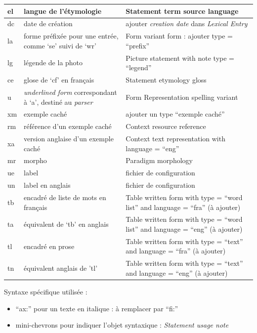 \documentclass[a4paper,12pt]{article}
\begin{document}
\begin{center}
\begin{longtable}{|p{4cm}|p{5cm}|p{6cm}|}
el & langue de l’étymologie & Statement term source language \\ \hline
dc & date de création & ajouter \textit{creation date} dans \textit{Lexical Entry} \\ \hline
la & forme préfixée pour une entrée, comme ‘se’ suivi de `wr' & Form variant form : ajouter type = “prefix” \\ \hline
lg & légende de la photo & Picture statement with note type = ``legend'' \\ \hline
ce & glose de `cf' en français & Statement etymology gloss \\ \hline
u & \textit{underlined form} correspondant à ‘a’, destiné au \textit{parser} & Form Representation spelling variant \\ \hline
xm & exemple caché & ajouter un type ``exemple caché'' \\ \hline
rm & référence d’un exemple caché & Context resource reference \\ \hline
xa & version anglaise d’un exemple caché & Context text representation with language = “eng” \\ \hline
mr & morpho & Paradigm morphology \\ \hline
ue & label & fichier de configuration \\ \hline
un & label en anglais & fichier de configuration \\ \hline
tb & encadré de liste de mots en français & Table written form with type = ``word list'' and language = ``fra'' (à ajouter) \\ \hline
ta & équivalent de ‘tb’ en anglais & Table written form with type = ``word list'' and language = ``eng'' (à ajouter) \\ \hline
tl & encadré en prose & Table written form with type = ``text'' and language = ``fra'' (à ajouter) \\ \hline
tn & équivalent anglais de ’tl’ & Table written form with type = ``text'' and language = ``eng'' (à ajouter) \\ \hline
\end{longtable}
\end{center}

Syntaxe spécifique utilisée :
\begin{itemize}
\item ``ax:'' pour un texte en italique : à remplacer par ``fi:''
\item mini-chevrons pour indiquer l’objet syntaxique : \textit{Statement usage note}
\end{itemize}
\end{document}
